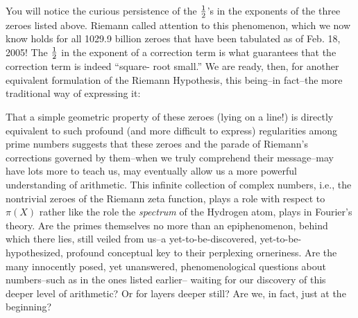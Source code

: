 \documentclass[11pt]{article}
\theoremstyle{plain}
\theoremstyle{definition}
\numberwithin{equation}{section}
\numberwithin{figure}{section}
\numberwithin{table}{section}
\begin{document}
\bigskip


You will notice the curious persistence of the ${1\over 2}$'s in the
exponents of the three zeroes listed above.  Riemann called attention
to this phenomenon, which we now know holds for all 1029.9 billion
zeroes that have been tabulated as of Feb.  18, 2005!  The ${1\over
  2}$ in the exponent of a correction term is what guarantees that the
correction term is indeed ``square- root small.'' We are ready, then,
for another equivalent formulation of the Riemann Hypothesis, this
being--in fact--the more traditional way of expressing it:
 
\bigskip

  \begin{center}
      \end{center}


\bigskip


That a simple geometric property of these zeroes (lying on a line!) is
directly equivalent to such profound (and more difficult to express)
regularities among prime numbers suggests that these zeroes and the
parade of Riemann's corrections governed by them--when we truly
comprehend their message--may have lots more to teach us, may
eventually allow us a more powerful understanding of arithmetic.  This
infinite collection of complex numbers, i.e., the nontrivial zeroes of
the Riemann zeta function, plays a role with respect to $\pi(X)$ rather
like the role the {\em spectrum} of the Hydrogen atom, plays in
Fourier's theory.  Are the primes themselves no more than an
epiphenomenon, behind which there lies, still veiled from us--a
yet-to-be-discovered, yet-to-be-hypothesized, profound conceptual key
to their perplexing orneriness.  Are the many innocently posed, yet
unanswered, phenomenological questions about numbers--such as in the
ones listed earlier-- waiting for our discovery of this deeper level
of arithmetic?  Or for layers deeper still?  Are we, in fact, just at
the beginning?
\end{document}
